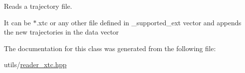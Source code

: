 Reads a trajectory file. 

It can be $\ast$.xtc or any other file defined in \+\_\+supported\+\_\+ext vector and appends the new trajectories in the data vector 

The documentation for this class was generated from the following file\+:\begin{DoxyCompactItemize}
\item 
utils/\hyperlink{reader__xtc_8hpp}{reader\+\_\+xtc.\+hpp}\end{DoxyCompactItemize}
